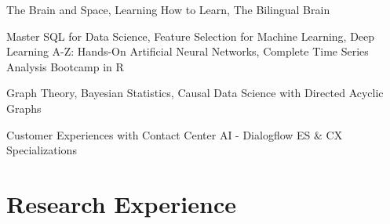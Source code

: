 \documentclass[letterpaper]{deedy-resume} %
\begin{document}
\sectionspace %
\vspace{\topsep} %
\begin{tightitemize}
\item The Brain and Space, Learning How to Learn, The Bilingual Brain
\item Master SQL for Data Science, Feature Selection for Machine Learning, Deep Learning A-Z: Hands-On Artificial Neural Networks, Complete Time Series Analysis Bootcamp in R
\item Graph Theory, Bayesian Statistics, Causal Data Science with Directed Acyclic Graphs
\item Customer Experiences with Contact Center AI - Dialogflow ES \& CX Specializations
\end{tightitemize}
\sectionspace %

\section{Research Experience}
\end{document}

